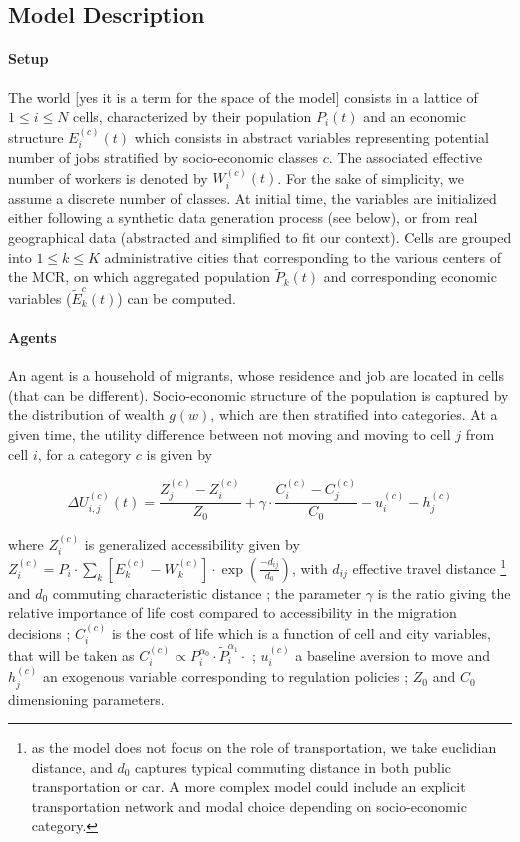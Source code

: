 \subsection{Model Description}

\paragraph{Setup}

The world [yes it is a term for the space of the model] consists in a lattice of $1 \leq i \leq N$ cells, characterized by their population $P_i(t)$ and an economic structure $E_i^{(c)}(t)$ which consists in abstract variables representing potential number of jobs stratified by socio-economic classes $c$. The associated effective number of workers is denoted by $W_i^{(c)}(t)$. For the sake of simplicity, we assume a discrete number of classes. At initial time, the variables are initialized either following a synthetic data generation process (see below), or from real geographical data (abstracted and simplified to fit our context). Cells are grouped into $1\leq k\leq K$ administrative cities that corresponding to the various centers of the MCR, on which aggregated population $\tilde{P}_k(t)$ and corresponding economic variables ($\tilde{E}_k^{c}(t)$) can be computed.

\newpage

\paragraph{Agents}

An agent is a household of migrants, whose residence and job are located in cells (that can be different). Socio-economic structure of the population is captured by the distribution of wealth $g(w)$, which are then stratified into categories. At a given time, the utility difference between not moving and moving to cell $j$ from cell $i$, for a category $c$ is given by

\[
\Delta U_{i,j}^{(c)}(t) = \frac{Z_j^{(c)}- Z_i^{(c)}}{Z_0} + \gamma \cdot \frac{C_i^{(c)}- C_j^{(c)}}{C_0} - u_i^{(c)} - h_j^{(c)}
\]

where $Z_i^{(c)}$ is generalized accessibility given by $Z_i^{(c)} = P_i \cdot \sum_k \left[E_k^{(c)}-W_k^{(c)}\right]\cdot \exp{\left(\frac{-d_{ij}}{d_0}\right)}$, with $d_{ij}$ effective travel distance \footnote{as the model does not focus on the role of transportation, we take euclidian distance, and $d_0$ captures typical commuting distance in both public transportation or car. A more complex model could include an explicit transportation network and modal choice depending on socio-economic category.} and $d_0$ commuting characteristic distance ; the parameter $\gamma$ is the ratio giving the relative importance of life cost compared to accessibility in the migration decisions ; $C_i^{(c)}$ is the cost of life which is a function of cell and city variables, that will be taken as $C_i^{(c)} \propto P_i^{\alpha_0}\cdot  \tilde{P}_i^{\alpha_1}\cdot$ ; $u_i^{(c)}$ a baseline aversion to move and $h_j^{(c)}$ an exogenous variable corresponding to regulation policies ; $Z_0$ and $C_0$ dimensioning parameters.

